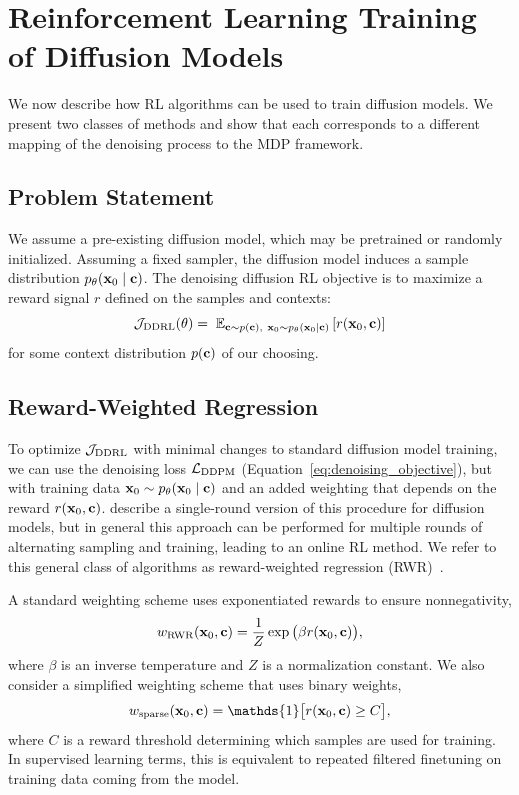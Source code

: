 \section{Reinforcement Learning Training of Diffusion Models}
\label{sec:algs}

We now describe how RL algorithms can be used to train diffusion models. 
We present two classes of methods and show that each corresponds to a different mapping of the denoising process to the MDP framework.

\subsection{Problem Statement}
We assume a pre-existing diffusion model, which may be pretrained or randomly initialized. Assuming a fixed sampler, the diffusion model induces a sample distribution $p_\theta(\mathbf{x}_0 \mid \mathbf{c})$.
The denoising diffusion RL objective is to maximize a reward signal $r$ defined on the samples and contexts:
\begin{equation*}
    \mathcal{J}_{\text{DDRL}}(\theta) = \; \mathbb{E}_{
        \mathbf{c} \sim p(\mathbf{c}),~\mathbf{x}_0 \sim p_\theta(\mathbf{x}_0 \mid \mathbf{c})
    } \left[ 
        r(\mathbf{x}_0, \mathbf{c})
     \right]
\end{equation*}
for some context distribution $p(\mathbf{c})$ of our choosing.


\subsection{Reward-Weighted Regression}
\label{sec:rwr}
To optimize $\mathcal{J}_{\text{DDRL}}$ with minimal changes to standard diffusion model training, we can use the denoising loss $\mathcal{L}_{\text{DDPM}}$ (Equation~\ref{eq:denoising_objective}), but with training data $\mathbf{x}_0 \sim p_\theta(\mathbf{x}_0 \mid \mathbf{c})$ and an added weighting that depends on the reward $r(\mathbf{x}_0, \mathbf{c})$.
\citet{lee2023aligning} describe a single-round version of this procedure for diffusion models, but in general this approach can be performed for multiple rounds of alternating sampling and training, leading to an online RL method.
We refer to this general class of algorithms as reward-weighted regression (RWR)~\citep{peters2007rwr}.

A standard weighting scheme uses exponentiated rewards to ensure nonnegativity,
\begin{align*}
    w_{\text{RWR}}(\mathbf{x}_0, \mathbf{c}) = \frac{1}{Z} \exp\big(\beta r(\mathbf{x}_0, \mathbf{c}) \big),
\end{align*}
where $\beta$ is an inverse temperature and $Z$ is a normalization constant.
We also consider a simplified weighting scheme that uses binary weights,
\begin{align*}
    w_\sparse(\bx_0, \bc) = \mathds{1} \big[ r(\bx_0, \bc) \geq C \big],
\end{align*}
where $C$ is a reward threshold determining which samples are used for training.
In supervised learning terms, this is equivalent to repeated filtered finetuning on training data coming from the model.

